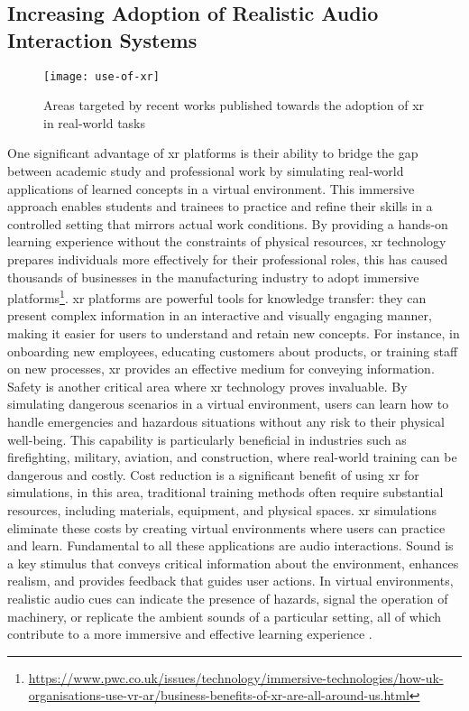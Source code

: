 \subsection{Increasing Adoption of Realistic Audio Interaction Systems}
\begin{figure}[htbp]
    \centering
    \texttt{[image: use-of-xr]}
    \caption[Adoption of XR in real-world tasks]{Areas targeted by recent works published towards the adoption of \acrshort{xr} in real-world tasks \citep{DEGIORGIO2023645}}
\end{figure}
One significant advantage of \acrshort{xr} platforms is their ability to bridge the gap between academic study and professional work by simulating real-world applications of learned concepts in a virtual environment. This immersive approach enables students and trainees to practice and refine their skills in a controlled setting that mirrors actual work conditions. By providing a hands-on learning experience without the constraints of physical resources, \acrshort{xr} technology prepares individuals more effectively for their professional roles, this has caused thousands of businesses in the manufacturing industry to adopt immersive platforms\footnote{\url{https://www.pwc.co.uk/issues/technology/immersive-technologies/how-uk-organisations-use-vr-ar/business-benefits-of-xr-are-all-around-us.html}}.
\acrshort{xr} platforms are powerful tools for knowledge transfer: they can present complex information in an interactive and visually engaging manner, making it easier for users to understand and retain new concepts. For instance, in onboarding new employees, educating customers about products, or training staff on new processes, \acrshort{xr} provides an effective medium for conveying information.
Safety is another critical area where \acrshort{xr} technology proves invaluable. By simulating dangerous scenarios in a virtual environment, users can learn how to handle emergencies and hazardous situations without any risk to their physical well-being. This capability is particularly beneficial in industries such as firefighting, military, aviation, and construction, where real-world training can be dangerous and costly. Cost reduction is a significant benefit of using \acrshort{xr} for simulations, in this area, traditional training methods often require substantial resources, including materials, equipment, and physical spaces. \acrshort{xr} simulations eliminate these costs by creating virtual environments where users can practice and learn.
Fundamental to all these applications are audio interactions. Sound is a key stimulus that conveys critical information about the environment, enhances realism, and provides feedback that guides user actions. In virtual environments, realistic audio cues can indicate the presence of hazards, signal the operation of machinery, or replicate the ambient sounds of a particular setting, all of which contribute to a more immersive and effective learning experience \citep{DEGIORGIO2023645, jot2021rendering}.
